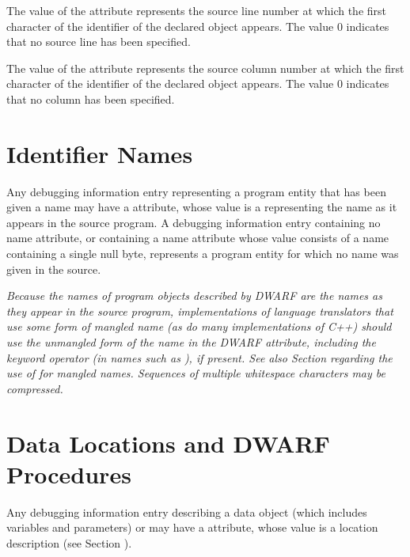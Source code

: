 The value of 
the \DWATdeclline{} attribute represents
the source line number at which the first character of
the identifier of the declared object appears. The value 0
indicates that no source line has been specified.

The value of 
the \DWATdeclcolumn{} attribute represents
the source column number at which the first character of
the identifier of the declared object appears. The value 0
indicates that no column has been specified.

\section{Identifier Names}
\label{chap:identifiernames}
Any 
\hypertarget{chap:DWATnamenameofdeclaration}{}
debugging information entry 
representing 
a program entity
that has been given a name may have a 
\DWATname{} attribute,
whose 
value is a  
representing the name as it appears in
the source program. A debugging information entry containing
no name attribute, or containing a name attribute whose value
consists of a name containing a single null byte, represents
a program entity for which no name was given in the source.

\textit{Because the names of program objects described by DWARF are the
names as they appear in the source program, implementations
of language translators that use some form of mangled name
(as do many implementations of C++) should use the unmangled
form of the name in the 
DWARF \DWATname{} attribute,
including the keyword operator (in names such as ),
if present. See also 
Section  regarding the use
of \DWATlinkagename{} for 
mangled names. 
Sequences of
multiple whitespace characters may be compressed.}

\section{Data Locations and DWARF Procedures}
Any debugging information entry describing a data object (which
\hypertarget{chap:DWATlocationdataobjectlocation}{}
includes variables and parameters) or 
may have 
a
\DWATlocation{} attribute,
whose value is a location description
(see Section ).


